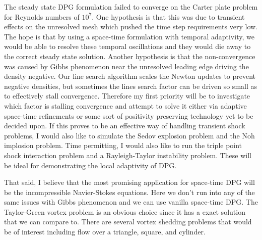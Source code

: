 \documentclass[Proposal.tex]{subfiles}
\begin{document}
The steady state DPG formulation failed to converge on the Carter plate problem for Reynolds numbers of $10^7$. 
One hypothesis is that this was due to transient effects on the unresolved mesh which pushed the time step requirements very low.
The hope is that by using a space-time formulation with temporal adaptivity, we would be able to resolve these temporal oscillations
and they would die away to the correct steady state solution.
Another hypothesis is that the non-convergence was caused by Gibbs phenomenon near the unresolved leading edge driving the density negative.
Our line search algorithm scales the Newton updates to prevent negative densities, but sometimes the lines search factor can be driven so small
as to effectively stall convergence.
Therefore my first priority will be to investigate which factor is stalling convergence and attempt to solve it either via adaptive space-time
refinements or some sort of positivity preserving technology yet to be decided upon.
If this proves to be an effective way of handling transient shock problems, 
I would also like to simulate the Sedov explosion problem and the Noh implosion problem.
Time permitting, I would also like to run the triple point shock interaction problem and a Rayleigh-Taylor instability problem.
These will be ideal for demonstrating the local adaptivity of DPG.

That said, I believe that the most promising application for space-time DPG will be the incompressible Navier-Stokes equations.
Here we don't run into any of the same issues with Gibbs phenomenon and we can use vanilla space-time DPG.
The Taylor-Green vortex problem is an obvious choice since it has a exact solution that we can compare to.
There are several vortex shedding problems that would be of interest including flow over a triangle, square, and cylinder.
\end{document}
